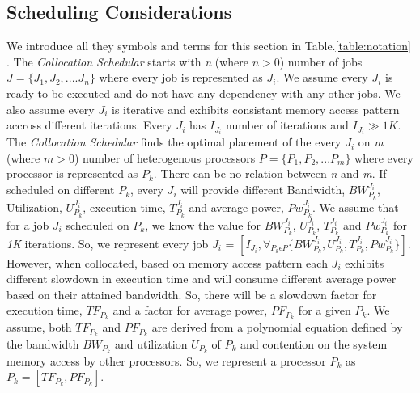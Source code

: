 \subsection{Scheduling Considerations}
We introduce all they symbols and terms for this section in Table.\ref{table:notation} . The 
\emph{Collocation Schedular} starts with \emph{n} (where $n > 0$) number of jobs $J=\{J_1, J_2, .... J_n\}$
where every job is represented as $J_i$. We assume every $J_i$ is ready to be
executed and do not have any dependency with any other jobs. We also assume every $J_i$ is iterative and exhibits
consistant memory access pattern accross different iterations. Every $J_i$ has $I_{J_i}$ number of iterations
and $I_{J_i}{\gg}1K$. The \emph{Collocation Schedular} finds the optimal placement of the every $J_i$ on
\emph{m} (where $m > 0$) number of heterogenous processors $P=\{P_1, P_2,...P_m\}$ where every processor
is represented as $P_k$. There can be no relation between \emph{n} and \emph{m}.
If scheduled on different $P_k$, every $J_i$ will provide different Bandwidth, $BW_{P_k}^{J_i}$, Utilization,
$U_{P_k}^{J_i}$, execution time, $T_{P_k}^{J_i}$ and average power, $Pw_{P_k}^{J_i}$. We assume that for a
job $J_i$ scheduled on $P_k$, we know the value for $BW_{P_k}^{J_i}$, $U_{P_k}^{J_i}$, $T_{P_k}^{J_i}$ and 
$Pw_{P_k}^{J_i}$ for \emph{1K} iterations. So, we represent every job $J_i$ = $[I_{J_i},\forall_{P_k\epsilon 
P}\{BW_{P_k}^{J_i}, U_{P_k}^{J_i}, T_{P_k}^{J_i}, Pw_{P_k}^{J_i}\}]$. However, when collocated, based on memory 
access pattern
each $J_i$ exhibits different slowdown in execution time and will consume different average power based on
their attained bandwidth. So, there will be a slowdown factor for execution time, $TF_{P_k}$ and a factor for 
average power, $PF_{P_k}$ for a given ${P_k}$. We assume, both $TF_{P_k}$ and $PF_{P_k}$ are derived from a
polynomial equation defined by the bandwidth $BW_{P_k}$ and utilization $U_{P_k}$ of ${P_k}$ and contention
on the system memory access by other processors. So, we represent a processor $P_k$ as $P_k=[TF_{P_k}, 
PF_{P_k}]$.

